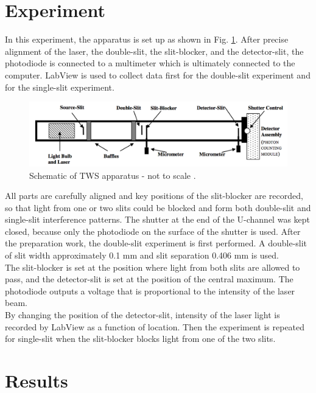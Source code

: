 \documentclass[prb,preprint]{revtex4-1}
\begin{document}
\section{Experiment}
In this experiment, the apparatus is set up as shown in Fig. \ref{dia}. After precise alignment of the laser, the double-slit, the slit-blocker, and the detector-slit, the photodiode is connected to a multimeter which is ultimately connected to the computer. LabView is used to collect data first for the double-slit experiment and for the single-slit experiment. \\

\begin{figure}[h!]
\centering
\includegraphics[width=7in]{dia}
\caption{Schematic of TWS apparatus - not to scale \cite{dia}.}
\label{dia}
\end{figure}
All parts are carefully aligned and key positions of the slit-blocker are recorded, so that light from one or two slits could be blocked and form both double-slit and single-slit interference patterns. The shutter at the end of the U-channel was kept closed, because only the photodiode on the surface of the shutter is used. After the preparation work, the double-slit experiment is first performed. A double-slit of slit width approximately 0.1 mm and slit separation 0.406 mm is used. \\

The slit-blocker is set at the position where light from both slits are allowed to pass, and the detector-slit is set at the position of the central maximum. The photodiode outputs a voltage that is proportional to the intensity of the laser beam. \\ 

By changing the position of the detector-slit, intensity of the laser light is recorded by LabView as a function of location. Then the experiment is repeated for single-slit when the slit-blocker blocks light from one of the two slits. \\
\section{Results}
\end{document}
